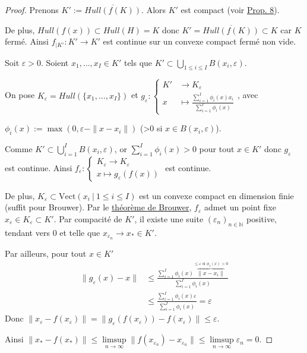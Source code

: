 \begin{proof}
	Prenons $K' := \overline{Hull\left( f\left( K \right)  \right) }$.
	Alors $K'$ est compact (voir \hyperlink{hull}{Prop. 8}).

	De plus, $Hull\left( f(x) \right) \subset Hull\left( H \right) = K$ donc $K' = \overline{Hull\left( f\left( K \right)  \right) } \subset K$ car $K$ fermé. Ainsi $f_{|K'} : K' \to K'$ est continue sur un convexe compact fermé non vide.

	Soit $\varepsilon>0$. Soient $x_1,\ldots, x_I \in K'$ tels que $K' \subset \bigcup_{1\le i\le I} B\left( x_i, \varepsilon \right) $.
	
 On pose $K_{\varepsilon}= Hull\left( \{x_1,\ldots, x_I\}  \right) $ et $		g_{\varepsilon}:  \begin{cases}
		    K' &\longrightarrow K_{\varepsilon} \\
		x &\longmapsto \frac{ \sum_{i=1}^{I} \phi_{i}\left( x \right) x_i}{\sum_{i=1}^{I} \phi_i\left( x \right) }
		\end{cases}$,
	avec 
 
 $\phi_i\left( x \right) := \max\left( 0, \varepsilon - \|x-x_i\| \right) $ (>0 si $x \in  B(x_i, \varepsilon)$).

	Comme $K'\subset \bigcup_{i=1} ^I B\left( x_i, \varepsilon \right) $, or $\sum_{i=1}^{I} \phi_i\left( x \right) >0$ pour tout $x \in K'$ donc $g_{\varepsilon}$ est continue.
 Ainsi $f_{\varepsilon} : \begin{cases}
    K_{\varepsilon} \to  K_{\varepsilon} \\    
    x \mapsto g_{\varepsilon}\left( f\left( x \right)  \right)
 \end{cases}$ est continue. 
 
 De plus, $K_{\varepsilon} \subset  \text{Vect}\left( x_i ~|~1\le i\le I \right) $ est un convexe compact en dimension finie (suffit pour Brouwer).  
 Par le \hyperlink{brouwer}{théorème de Brouwer}, $f_{\varepsilon}$ admet un point fixe $x_{\varepsilon} \in K_{\varepsilon} \subset K'$.
 Par compacité de $K'$, il existe une suite $\left( \varepsilon_{n} \right) _{n\in \mathbb{N}}$ positive, tendant vers $0$ et telle que $x_{\varepsilon_n} \to  x_{*} \in K'$.

	Par ailleurs, pour tout $x \in K'$ \begin{align*}
		\|g_{\varepsilon}\left( x \right) -x\| &\le \frac{\sum_{i=1}^{I} \phi_{i}\left( x \right)\overbrace{\|x-x_i\|}^{\le \varepsilon \text{ si } \phi_{1}\left( x \right) >0}}{\sum_{i=1}^{I} \phi_i\left( x \right) }\\
						       &\le \frac{ \sum_{i=1}^{I} \phi_i\left( x \right) \varepsilon}{\sum_{i=1}^{I} \phi_i\left( x \right) } =\varepsilon
	\end{align*}
	Donc $\|x_{\varepsilon}- f\left( x_{\varepsilon} \right) \| = \| g_{\varepsilon}\left( f\left( x_{\varepsilon} \right)  \right) - f\left( x_{\varepsilon} \right) \| \le \varepsilon$.

	Ainsi $\|x_{*} - f\left( x_* \right) \| \le \limsup \limits_{n\to \infty } \| f\left( x_{ \varepsilon_n} \right) - x_{\varepsilon_n}\| \le \limsup \limits_{n\to \infty} \varepsilon_n = 0$.
\end{proof}

